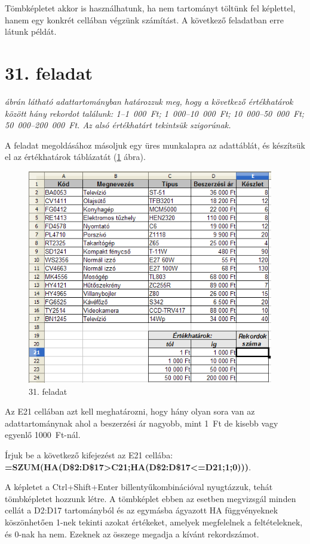 Tömbképletet akkor is használhatunk, ha nem tartományt
töltünk fel képlettel, hanem egy konkrét cellában végzünk
számítást. A következő feladatban erre látunk példát.


\section{31. feladat}
{\itshape
{} ábrán látható adattartományban határozzuk meg,
hogy a következő értékhatárok között hány rekordot
találunk: 1--1~000~Ft; 1~000--10~000~Ft; 10~000--50~000~Ft;
50~000--200~000~Ft. Az alsó értékhatárt tekintsük szigorúnak.}

A feladat megoldásához másoljuk egy üres munkalapra az
adattáblát, és készítsük el az értékhatárok
táblázatát (\ref{31-feladat} ábra). 

\begin{figure}[!h]
\begin{center}
\includegraphics[width=10.73cm]{oocalcv2-img138.png}
\caption{31. feladat}\label{31-feladat}
\end{center}
\end{figure}

Az E21 cellában azt kell meghatározni, hogy hány olyan sora van az
adattartománynak ahol a beszerzési ár nagyobb, mint 1~Ft de
kisebb vagy egyenlő 1000~Ft-nál.

Írjuk be a következő kifejezést az E21 cellába:\\
{\sffamily\bfseries{=SZUM(HA(D\$2:D\$17>C21;HA(D\$2:D\$17<=D21;1;0)))}}.

A képletet a Ctrl+Shift+Enter billentyűkombinációval
nyugtázzuk, tehát tömbképletet hozzunk létre. A
tömbképlet ebben az esetben megvizsgál minden cellát a D2:D17
tartományból és az egymásba ágyazott HA függvényeknek
köszönhetően 1-nek tekinti azokat értékeket, amelyek
megfelelnek a feltételeknek, és 0-nak ha nem. Ezeknek az összege
megadja a kívánt rekordszámot.

